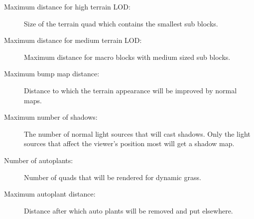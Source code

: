 \documentclass[a4paper]{article}
\begin{document}
\begin{description}
  \item[Maximum distance for high terrain LOD:] Size of the terrain quad which contains the smallest sub blocks.
  \item[Maximum distance for medium terrain LOD:] Maximum distance for macro blocks with medium sized sub blocks.
  \item[Maximum bump map distance:] Distance to which the terrain appearance will be improved by normal maps.
  \item[Maximum number of shadows:] The number of normal light sources that will cast shadows. Only the light sources that affect the viewer's position most will get a shadow map.
  \item[Number of autoplants:] Number of quads that will be rendered for dynamic grass.
  \item[Maximum autoplant distance:] Distance after which auto plants will be removed and put elsewhere.
\end{description}
\end{document}
